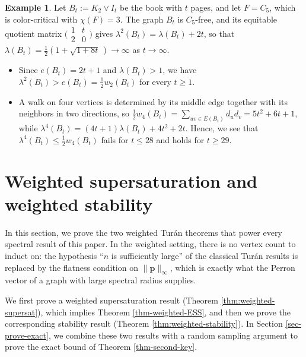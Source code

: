 \documentclass[11pt, a4paper]{article}
\theoremstyle{definition}
\newtheorem{example}[theorem]{Example}
\theoremstyle{plain}
\renewcommand{\le}{\leqslant}
\renewcommand{\ge}{\geqslant}
\begin{document}
\begin{example} \label{ex:book}
Let $B_t:=K_2\vee I_t$ be the book with $t$ pages, and let
$F=C_5$, which is color-critical with $\chi (F)=3$. The
graph $B_t$ is $C_5$-free, and its equitable quotient
matrix
$\bigl(\begin{smallmatrix}1&t\\2&0\end{smallmatrix}\bigr)$
gives $\lambda^{2}(B_t)=\lambda (B_t)+2t$, so that
$\lambda (B_t)=\frac{1}{2}(1+\sqrt{1+8t}\,)\to \infty$ as
$t\to \infty$.
\begin{itemize}
\item[(i)] Since $e(B_t)=2t+1$ and $\lambda (B_t)>1$, we
  have $\lambda^{2}(B_t)>e(B_t)=\tfrac12w_2(B_t)$ for
  every $t\ge 1$.
\item[(ii)] A walk on four vertices is determined by its
  middle edge together with its neighbors in two
  directions, so
  $\tfrac12w_4(B_t)=\sum_{uv\in E(B_t)}d_ud_v
  =5t^2+6t+1$, while
  $\lambda^{4}(B_t)=(4t+1)\lambda (B_t)+4t^2+2t$. Hence,
  we see that $\lambda^{4}(B_t)\le \tfrac12w_4(B_t)$ fails
  for $t\le 28$ and holds for $t\ge 29$.
\end{itemize}
\end{example}





\section{Weighted supersaturation and weighted stability} 

\label{sec:weighted}


 
In this section, we prove 
the two weighted Tur\'{a}n theorems
that power every spectral result of this paper. 
In the weighted setting, 
there is no vertex count to induct on: 
the hypothesis ``$n$ is sufficiently large'' of the classical Tur\'{a}n results is replaced by the flatness condition on
$\lVert \bm{p}\rVert_\infty$, which is exactly what the
Perron vector of a graph with large spectral radius
supplies. 


We first prove a weighted supersaturation result  (Theorem \ref{thm:weighted-supersat}), 
which implies Theorem \ref{thm-weighted-ESS}, 
and then we prove the corresponding stability 
result (Theorem \ref{thm:weighted-stability}). 
In Section \ref{sec-prove-exact}, 
we combine these two results with a random sampling argument to prove the exact bound of Theorem \ref{thm-second-key}.
\end{document}
